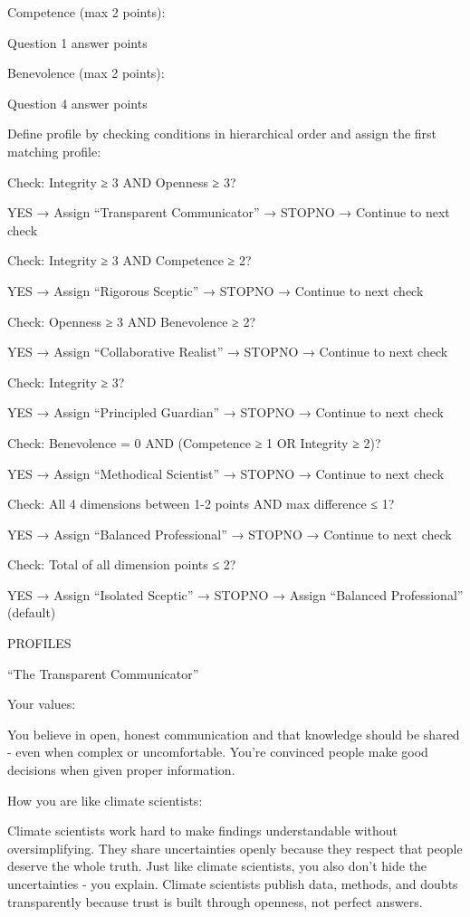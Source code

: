 \documentclass[
  letterpaper,
  DIV=11,
  numbers=noendperiod]{scrartcl}
\begin{document}
Competence (max 2 points):

Question 1 answer points

Benevolence (max 2 points):

Question 4 answer points

Define profile by checking conditions in hierarchical order and assign
the first matching profile:

Check: Integrity ≥ 3 AND Openness ≥ 3?

YES → Assign ``Transparent Communicator'' → STOPNO → Continue to next
check

Check: Integrity ≥ 3 AND Competence ≥ 2?

YES → Assign ``Rigorous Sceptic'' → STOPNO → Continue to next check

Check: Openness ≥ 3 AND Benevolence ≥ 2?

YES → Assign ``Collaborative Realist'' → STOPNO → Continue to next check

Check: Integrity ≥ 3?

YES → Assign ``Principled Guardian'' → STOPNO → Continue to next check

Check: Benevolence = 0 AND (Competence ≥ 1 OR Integrity ≥ 2)?

YES → Assign ``Methodical Scientist'' → STOPNO → Continue to next check

Check: All 4 dimensions between 1-2 points AND max difference ≤ 1?

YES → Assign ``Balanced Professional'' → STOPNO → Continue to next check

Check: Total of all dimension points ≤ 2?

YES → Assign ``Isolated Sceptic'' → STOPNO → Assign ``Balanced
Professional'' (default)

PROFILES

``The Transparent Communicator''

Your values:

You believe in open, honest communication and that knowledge should be
shared - even when complex or uncomfortable. You're convinced people
make good decisions when given proper information.

How you are like climate scientists:

Climate scientists work hard to make findings understandable without
oversimplifying. They share uncertainties openly because they respect
that people deserve the whole truth. Just like climate scientists, you
also don't hide the uncertainties - you explain. Climate scientists
publish data, methods, and doubts transparently because trust is built
through openness, not perfect answers.
\end{document}
